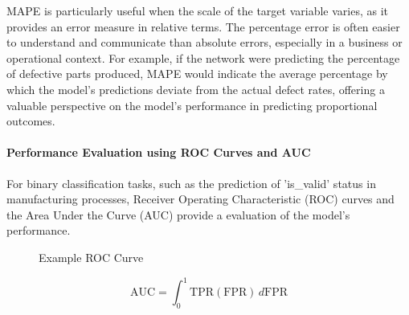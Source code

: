 MAPE is particularly useful when the scale of the target variable varies, as it provides an error measure in relative terms. The percentage error is often easier to understand and communicate than absolute errors, especially in a business or operational context. For example, if the network were predicting the percentage of defective parts produced, MAPE would indicate the average percentage by which the model's predictions deviate from the actual defect rates, offering a valuable perspective on the model's performance in predicting proportional outcomes.

\paragraph{\textbf{Performance Evaluation using ROC Curves and AUC}}
For binary classification tasks, such as the prediction of 'is\_valid' status in manufacturing processes, Receiver Operating Characteristic (ROC) curves and the Area Under the Curve (AUC) provide a evaluation of the model's performance.

\begin{figure}[h]
  \centering
  \caption{Example ROC Curve}
  \label{fig:roc}
\end{figure}

\begin{equation}
  \text{AUC} = \int_{0}^{1} \text{TPR}(\text{FPR}) \, d\text{FPR}
  \label{eq:auc}
\end{equation}

